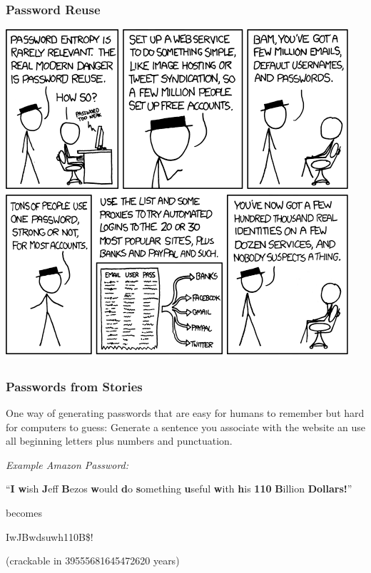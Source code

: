 \documentclass[aspectratio=1610,dvipsnames]{beamer}
\begin{document}
\begin{frame}
\frametitle{Password Reuse}
\begin{center}
\includegraphics[scale=0.43]{images/password_reuse.png} 
\end{center}
\end{frame}

\begin{frame}[fragile]
\frametitle{Passwords from Stories}

One way of generating passwords that are easy for humans to remember but hard for computers to guess: Generate a sentence you associate with the website an use all beginning letters plus numbers and punctuation.
\pause\bigskip\bigskip

\emph{Example Amazon Password:}
\begin{center}
\large
``\textbf{I} \textbf{w}ish \textbf{J}eff \textbf{B}ezos \textbf{w}ould \textbf{d}o
\textbf{s}omething \textbf{u}seful \textbf{w}ith \textbf{h}is \textbf{110} \textbf{B}illion \textbf{Dollars!}''
\bigskip

becomes
\bigskip

IwJBwdsuwh110B\$!
\end{center}
\begin{flushright}
\small
(crackable in 39555681645472620 years)
\end{flushright}

\normalsize
\end{frame}
\end{document}
